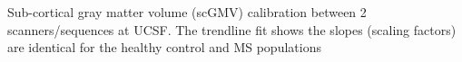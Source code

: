 \label{fig:hcms_scGMV} Sub-cortical gray matter volume (scGMV) calibration between 2 scanners/sequences at UCSF. The trendline fit shows the slopes (scaling factors) are identical for the healthy control and MS populations